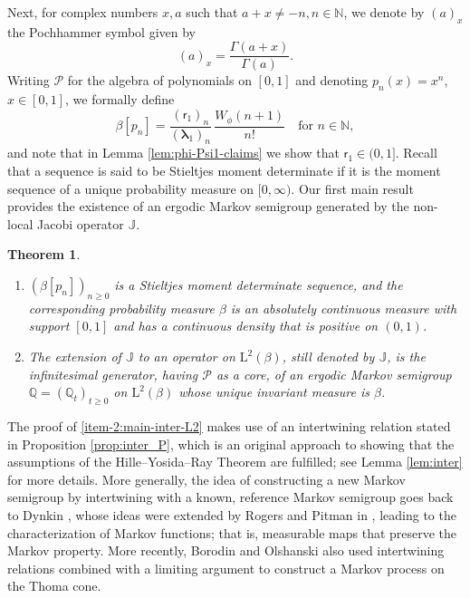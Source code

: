 \documentclass[10pt]{amsart}
\theoremstyle{plain}
\newtheorem{theorem}{Theorem}[section]
\theoremstyle{definition}
\newcommand{\N}{\mathbb{N}}
\newcommand{\Poly}{\mathscr{P}}
\newcommand{\J}{\mathds{Q}}
\newcommand{\calJ}{\mathds{J}}
\newcommand{\Leb}{\mathrm{L}}
\newcommand{\lam}{{\bm{\lambda}_1}}
\newcommand{\vat}{{\mathsf{r}_1}}
\let\bpsi\beta
\begin{document}
Next, for complex numbers $x,a$ such that $a+x\neq -n, n\in\N$, we denote by $(a)_x$ the Pochhammer symbol\vspace*{-3pt}
given by
\begin{equation}
\label{eq:defPoc}
(a)_x = \frac{\Gamma(a+x)}{\Gamma(a)}.
\end{equation}
Writing $\Poly$ for the algebra of polynomials on $[0,1]$ and denoting $p_n(x) = x^n$, $x \in [0,1]$,
we formally define\vspace*{-3pt}
\begin{equation}
\label{eq:mom-bpn}
\bpsi[p_n] = \frac{(\vat)_n}{(\lam)_n}\,\frac{W_{\phi}(n+1)}{n!} \quad \mbox{for } n \in \N,
\end{equation}
and note that in Lemma \ref{lem:phi-Psi1-claims} we show that $\vat \in (0,1]$. Recall that a sequence is said to be Stieltjes moment determinate if it is the moment sequence of a unique probability measure on $[0,\infty)$. Our first main result provides the existence of an ergodic Markov semigroup generated by the non-local Jacobi operator $\calJ$.

\skpt
\begin{theorem} \label{thm:main-inter-L2}
\begin{enumerate}
\item \label{item-1:main-inter-L2}
$(\bpsi [ p_n ])_{n \geq 0}$ is a Stieltjes moment determinate sequence, and the corresponding probability measure $\bpsi$ is an absolutely continuous
measure with support $[0,1]$ and has a continuous density that is positive on $(0,1)$.
\item \label{item-2:main-inter-L2} The extension of $\calJ$ to an operator on $\Leb^2(\bpsi)$, still denoted by $\calJ$, is the infinitesimal generator, having $\Poly$ as a core, of an ergodic Markov semigroup $\J = (\J_t)_{t \geq 0}$ on $\Leb^2(\bpsi)$ whose unique invariant measure is $\bpsi$.
\end{enumerate}
\end{theorem}

The proof of \eqref{item-2:main-inter-L2} makes use of an intertwining relation stated in Proposition \ref{prop:inter_P}, which is an original approach to showing that the assumptions of the Hille--Yosida--Ray Theorem are fulfilled; see Lemma \ref{lem:inter} for more details. More generally, the idea of constructing a new Markov semigroup by intertwining with a known, reference Markov semigroup goes back to Dynkin \cite{dynkin:1965}, whose ideas were extended by Rogers and Pitman in \cite{rogers:1981},
leading to the characterization of Markov functions; that is, measurable maps that preserve the Markov property. More recently, Borodin and Olshanski \cite{thoma-cone} also used intertwining relations combined with a limiting argument to construct a Markov process on the Thoma cone.
\end{document}
